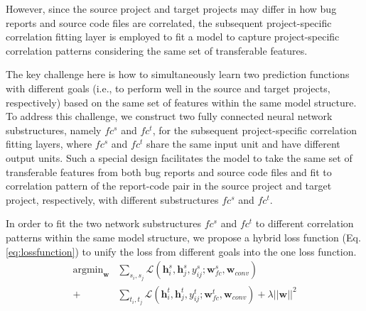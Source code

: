However, since the source project and target projects may differ in how bug reports and source code files are correlated, the subsequent project-specific correlation fitting layer is employed to fit a model to capture project-specific correlation patterns considering the same set of transferable features.


The key challenge here is how to simultaneously learn two prediction functions with different goals (i.e., to perform well in the source and target projects, respectively) based on the same set of features within the same model structure. To address this challenge, we construct two fully connected neural network substructures, namely $fc^s$ and $fc^t$, for the subsequent project-specific correlation fitting layers, where $fc^s$ and $fc^t$ share the same input unit and have different output units. Such a special design facilitates the model to take the same set of transferable features from both bug reports and source code files and fit to correlation pattern of the report-code pair in the source project and target project, respectively, with different substructures $fc^s$ and $fc^t$.


In order to fit the two network substructures $fc^s$ and $fc^t$ to different correlation patterns within the same model structure, we propose a hybrid loss function (Eq. \ref{eq:lossfunction}) to unify the loss from different goals into the one loss function.
\begin{equation}
\begin{aligned}
\label{eq:lossfunction}
\mathop{\arg\min}_{\mathbf{w}}&\sum_{s_i,s_j}\mathcal{L}(\mathbf{h}^s_i,\mathbf{h}^s_j
,y^s_{ij}; \mathbf{w}^s_{fc}, \mathbf{w}_{conv} )\\
+&\sum_{t_i,t_j}\mathcal{L}(\mathbf{h}^t_i,\mathbf{h}^t_j,y^t_{ij};\mathbf{w}^t_{fc}, \mathbf{w}_{conv})+\lambda||\mathbf{w}||^2
\end{aligned}
\end{equation}

